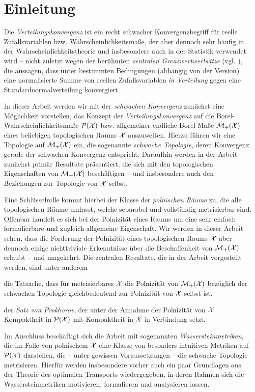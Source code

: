 \documentclass[../thesis/thesis.tex]{subfiles}
\begin{document}
	
	\chapter{Einleitung}
	
	Die \emph{Verteilungskonvergenz} ist ein recht schwacher Konvergenzbegriff für reelle Zufallsvariablen bzw. Wahrscheinlichkeitsmaße, der
	aber dennoch sehr häufig in der Wahrscheinlichkeitstheorie und insbesondere auch in der Statistik verwendet wird -- nicht zuletzt
	wegen der berühmten \emph{zentralen Grenzwertwertsätze} (vgl. \cite[Kapitel 7]{Henze.2016}), die aussagen, dass unter bestimmten Bedingungen (abhängig von der Version)
	eine normalisierte Summe von reellen Zufallsvariablen \emph{in Verteilung} gegen eine Standardnormalverteilung konvergiert.
	
	In dieser Arbeit werden wir mit der \emph{schwachen Konvergenz} zunächst eine Möglichkeit vorstellen, das Konzept der \emph{Verteilungskonvergenz} 
	auf die Borel-Wahrscheinlichkeitsmaße $\mathcal{P}(\mathcal{X})$ bzw. allgemeiner endliche Borel-Maße $\mathcal{M}_{+}(\mathcal{X})$ eines 
	beliebigen topologischen Raums $\mathcal{X}$ auszuweiten. Hierzu führen wir eine Topologie
	auf $\mathcal{M}_{+}(\mathcal{X})$ ein, die sogenannte \emph{schwache Topologie}, deren Konvergenz gerade der schwachen Konvergenz entspricht.
	Daraufhin werden in der Arbeit zunächst primär Resultate präsentiert, die sich mit den topologischen Eigenschaften 
	von $\mathcal{M}_{+}(\mathcal{X})$ beschäftigen -- und insbesondere auch den Beziehungen zur Topologie von $\mathcal{X}$ selbst.
	
	Eine Schlüsselrolle kommt hierbei der Klasse der \emph{polnischen Räume} zu, die alle topologischen Räume umfasst, welche separabel und vollständig 
	metrisierbar sind. Offenbar handelt es sich bei der Polnizität eines Raums um eine sehr einfach formulierbare und zugleich allgemeine Eigenschaft. 
	Wir werden in dieser Arbeit sehen, dass die Forderung der Polnizität 
	eines topologischen Raums $\mathcal{X}$ aber dennoch einige nichttriviale Erkenntnisse über die Beschaffenheit von $\mathcal{M}_{+}(\mathcal{X})$ erlaubt -- und umgekehrt.
	Die zentralen Resultate, die in der Arbeit vorgestellt werden, sind unter anderem
	\begin{itemizethm}
		\item die Tatsache, dass für metrisierbares $\mathcal{X}$ die Polnizität von $\mathcal{M}_{+}(\mathcal{X})$ bezüglich der schwachen Topologie
		gleichbedeutend zur Polnizität von $\mathcal{X}$ selbst ist.
		\item der \emph{Satz von Prokhorov}, der unter der Annahme der Polnizität von $\mathcal{X}$ Kompaktheit in $\mathcal{P}(\mathcal{X})$ mit Kompaktheit in $\mathcal{X}$ in Verbindung setzt.
	\end{itemizethm}
	Im Anschluss beschäftigt sich die Arbeit mit sogenannten \emph{Wassersteinmetriken}, die im Falle von polnischem $\mathcal{X}$ eine Klasse von 
	besonders intuitiven Metriken auf $\mathcal{P}(\mathcal{X})$ darstellen, die -- unter gewissen Voraussetzungen -- die schwache Topologie metrisieren. 
	Hierfür werden insbesondere vorher auch ein paar Grundlagen aus der Theorie des optimalen Transports wiedergegeben, in deren Rahmen sich 
	die Wassersteinmetriken motivieren, formulieren und analysieren lassen.
	
\end{document}
